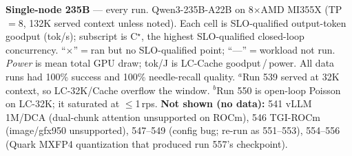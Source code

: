 \begin{table}[t]
  \caption{\textbf{Single-node 235B} --- every run. Qwen3-235B-A22B on
  8$\times$AMD MI355X (TP$=$8, 132K served context unless noted). Each cell is
  SLO-qualified output-token goodput (tok/s); subscript is C$^\star$, the highest
  SLO-qualified closed-loop concurrency. ``$\times$''$=$ran but no SLO-qualified
  point; ``---''$=$workload not run. \emph{Power} is mean total GPU draw; tok/J
  is LC-Cache goodput\,/\,power. All data runs had 100\% success and 100\%
  needle-recall quality.
  $^a$Run 539 served at 32K context, so LC-32K/Cache overflow the window.
  $^b$Run 550 is open-loop Poisson on LC-32K; it saturated at $\le$1\,rps.
  \textbf{Not shown (no data):} 541 vLLM 1M/DCA (dual-chunk attention
  unsupported on ROCm), 546 TGI-ROCm (image/gfx950 unsupported), 547--549
  (config bug; re-run as 551--553), 554--556 (Quark MXFP4 quantization that
  produced run 557's checkpoint).}
  \label{tab:single-node-235b}
\end{table}
